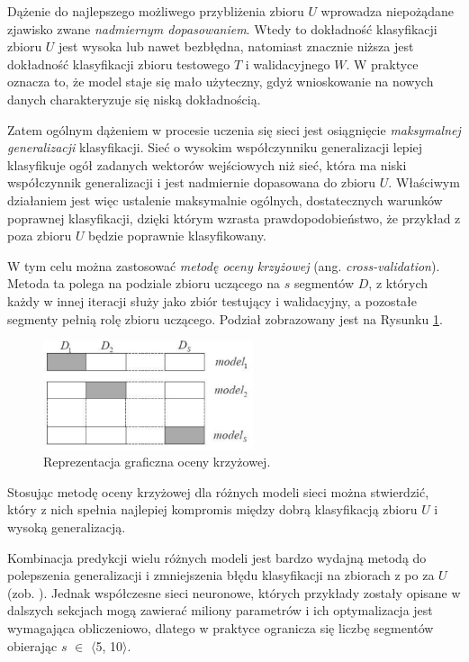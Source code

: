 Dążenie do najlepszego możliwego przybliżenia zbioru $U$ wprowadza niepożądane zjawisko zwane \textit{nadmiernym dopasowaniem}. Wtedy to dokładność klasyfikacji zbioru $U$ jest wysoka lub nawet bezbłędna, natomiast znacznie niższa jest dokładność klasyfikacji zbioru testowego $T$ i walidacyjnego $W$. W praktyce oznacza to, że model staje się mało użyteczny, gdyż wnioskowanie na nowych danych charakteryzuje się niską dokładnością.

Zatem ogólnym dążeniem w procesie uczenia się sieci jest osiągnięcie \textit{maksymalnej generalizacji} klasyfikacji. Sieć o wysokim współczynniku generalizacji lepiej klasyfikuje ogół zadanych wektorów wejściowych niż sieć, która ma niski współczynnik generalizacji i jest nadmiernie dopasowana do zbioru $U$. Właściwym działaniem jest więc ustalenie maksymalnie ogólnych, dostatecznych warunków poprawnej klasyfikacji, dzięki którym wzrasta prawdopodobieństwo, że przykład z poza zbioru $U$ będzie poprawnie klasyfikowany.

W tym celu można zastosować \textit{metodę oceny krzyżowej} (ang. \textit{cross-validation}). Metoda ta polega na podziale zbioru uczącego na $s$ segmentów $D$, z których każdy w innej iteracji służy jako zbiór testujący i walidacyjny, a pozostałe segmenty pełnią rolę zbioru uczącego. Podział zobrazowany jest na Rysunku \ref{cross-validation}.
\begin{figure}[h!]
	\centering
	\includegraphics[width=0.55\textwidth]{figures/cross-validation.png}
	\caption{Reprezentacja graficzna oceny krzyżowej.}
	\label{cross-validation}
\end{figure}
Stosując metodę oceny krzyżowej dla różnych modeli sieci można stwierdzić, który z nich spełnia najlepiej kompromis między dobrą klasyfikacją zbioru $U$ i wysoką generalizacją.

Kombinacja predykcji wielu różnych modeli jest bardzo wydajną metodą do polepszenia generalizacji i zmniejszenia błędu klasyfikacji na zbiorach z po za $U$ (zob. \cite{Bell2007, Breiman2001}). Jednak współczesne sieci neuronowe, których przykłady zostały opisane w dalszych sekcjach mogą zawierać miliony parametrów i ich optymalizacja jest wymagająca obliczeniowo, dlatego w praktyce ogranicza się liczbę segmentów obierając $s$ $\in$ $\langle$5, 10$\rangle$.

